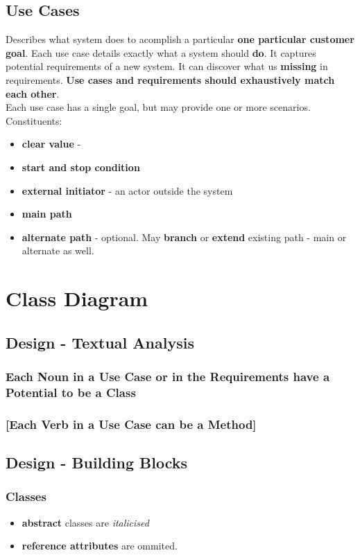 \documentclass{report}
\begin{document}
\section{Use Cases}
Describes what system does to acomplish a particular \textbf{one particular 
customer goal}. Each use case details exactly what a system should \textbf{do}.
It captures potential requirements of a new system. It can discover what us
\textbf{missing} in requirements. \textbf{Use cases and requirements should exhaustively match each other}.\\
Each use case has a single goal, but may provide one or more scenarios. Constituents:
\begin{itemize}
  \item \textbf{clear value} - 
  \item \textbf{start and stop condition}
  \item \textbf{external initiator} - an actor outside the system
  \item \textbf{main path}
  \item \textbf{alternate path} - optional. May \textbf{branch} or \textbf{extend} 
  existing path - main or alternate as well.
\end{itemize}



\chapter{Class Diagram}


\section{Design - Textual Analysis}

\subsection{Each Noun in a Use Case or in the Requirements have
a Potential to be a Class}

\subsection{[Each Verb in a Use Case can be a Method]}


\section{Design - Building Blocks}

\subsection{Classes}
\begin{itemize}
  \item \textbf{abstract} classes are \textit{italicised}
  \item \textbf{reference attributes} are ommited.
\end{itemize}
\end{document}
